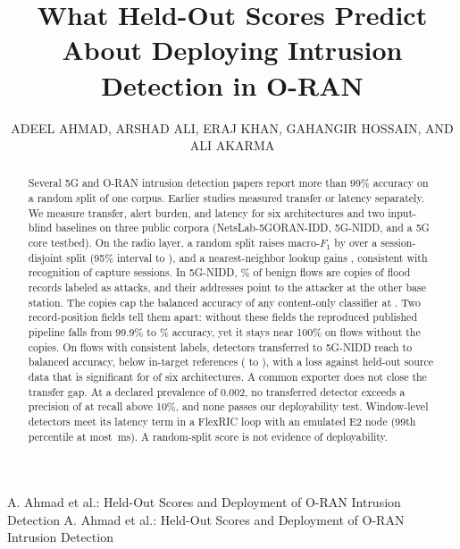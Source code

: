 \documentclass{ieeeaccess}
\begin{document}
\history{}
\doi{}

\title{What Held-Out Scores Predict About Deploying Intrusion Detection in O-RAN}
\author{\uppercase{Adeel Ahmad}, \uppercase{Arshad Ali}, \uppercase{Eraj Khan}, \uppercase{Gahangir Hossain}, AND \uppercase{Ali Akarma}}
\address[1]{Faculty of Computer and Information Systems, Islamic University of Madinah, Al Madinah Al Munawarah, Saudi Arabia}
\address[2]{Faculty of Computer Information Science, Higher Colleges Of Technology, Al Mizn- Baniyas North- Abu Dhabi, United Arab Emirates (e-mail: ekhan@hct.ac.ae)}
\address[3]{Anuradha and Vikas Sinha Department of Data Science, University of North Texas, Denton, TX, USA, 76203-5017}

\markboth
{A. Ahmad et al.: Held-Out Scores and Deployment of O-RAN Intrusion Detection}
{A. Ahmad et al.: Held-Out Scores and Deployment of O-RAN Intrusion Detection}

\begin{abstract}
Several 5G and O-RAN intrusion detection papers report more than 99\% accuracy on a random split of one corpus. Earlier studies measured transfer or latency separately. We measure transfer, alert burden, and latency for six architectures and two input-blind baselines on three public corpora (NetsLab-5GORAN-IDD, 5G-NIDD, and a 5G core testbed). On the radio layer, a random split raises macro-$F_1$ by \LeakAvg{} over a session-disjoint split (95\% interval \LeakAvgNbLo{} to \LeakAvgNbHi{}), and a nearest-neighbor lookup gains \NNGain{}, consistent with recognition of capture sessions. In 5G-NIDD, \LcBenignTwinPct\% of benign flows are copies of flood records labeled as attacks, and their addresses point to the attacker at the other base station. The copies cap the balanced accuracy of any content-only classifier at \LcCeilNative{}. Two record-position fields tell them apart: without these fields the reproduced published pipeline falls from 99.9\% to \PubOneNoposAccMax\% accuracy, yet it stays near 100\% on flows without the copies. On flows with consistent labels, detectors transferred to 5G-NIDD reach \TrCleanTgtBAmin{} to \TrCleanTgtBAmax{} balanced accuracy, below in-target references (\TgtRandShCleanBAmin{} to \TgtFileShCleanBAmax{}), with a loss against held-out source data that is significant for \TrCleanSig{} of six architectures. A common exporter does not close the transfer gap. At a declared prevalence of 0.002, no transferred detector exceeds a precision of \ThAPPVbest{} at recall above 10\%, and none passes our deployability test. Window-level detectors meet its latency term in a FlexRIC loop with an emulated E2 node (99th percentile at most \RicLoopTenPnnMax{}\,ms). A random-split score is not evidence of deployability.
\end{abstract}
\end{document}
